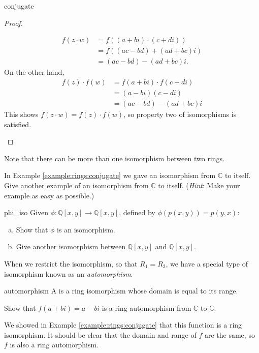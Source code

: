 \begin{example}{conjugate}
\begin{proof}{}
\begin{enumerate}[(1)]
\begin{align*}
  f(z\cdot w)&=f((a+bi)\cdot(c+di))\\
  &=f((ac-bd)+(ad+bc)i)\\
  &=(ac-bd)-(ad+bc)i.
\end{align*}
On the other hand,
\begin{align*}
f(z)\cdot f(w)&=f(a+bi)\cdot f(c+di)\\
&=(a-bi)(c-di)\\
&=(ac-bd)-(ad+bc)i
\end{align*}
This shows $f(z\cdot w)=f(z)\cdot f(w)$, so property two of isomorphisms is satisfied.
\end{enumerate}
\end{proof}
\end{example}

Note that there can be more than one isomorphism between two rings.

\begin{exercise}{}
In Example \ref{example:rings:conjugate} we gave an isomorphism from ${\mathbb C}$ to itself.  Give another example of an isomorphism from ${\mathbb C}$ to itself.  (\emph{Hint}:  Make your example as easy as possible.)
\end{exercise}

\begin{exercise}{phi_iso}
Given $\phi:  {\mathbb Q}[x,y]\rightarrow{\mathbb Q}[x,y]$, defined by $\phi(p(x,y))=p(y,x)$:
\begin{enumerate}[(a)]
\item Show that $\phi$ is an isomorphism.
\item Give another isomorphism between ${\mathbb Q}[x,y]$ and ${\mathbb Q}[x,y]$.
\end{enumerate}
\end{exercise}

When we restrict the isomorphism, so that $R_1=R_2$, we have a special type of isomorphism known as an \emph{automorphism}.

\begin{defn}{automorphism}
A  is a ring isomorphism whose domain is equal to its range.
\end{defn}

\begin{example}{}
Show that $f(a+bi)=a-bi$ is a ring automorphism from ${\mathbb C}$ to ${\mathbb C}$.

We showed in Example \ref{example:rings:conjugate} that this function is a ring isomorphism.  It should be clear that the domain and range of $f$ are the same, so $f$ is also a ring automorphism.  
\end{example}

